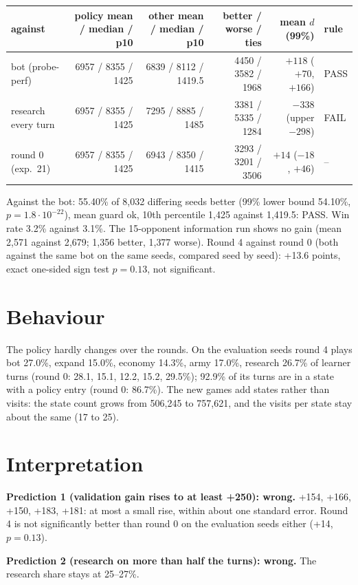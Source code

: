 \documentclass{../polyexp}
\begin{document}
\begin{center}\small
\begin{tabular}{lrrrrl}
\toprule
against & policy mean / median / p10 & other mean / median / p10 & better / worse / ties & mean $d$ (99\%) & rule \\
\midrule
bot (probe-perf) & 6957 / 8355 / 1425 & 6839 / 8112 / 1419.5 & 4450 / 3582 / 1968 & $+118$ ($+70$, $+166$) & PASS \\
research every turn & 6957 / 8355 / 1425 & 7295 / 8885 / 1485 & 3381 / 5335 / 1284 & $-338$ (upper $-298$) & FAIL \\
round 0 (exp.\ 21) & 6957 / 8355 / 1425 & 6943 / 8350 / 1415 & 3293 / 3201 / 3506 & $+14$ ($-18$, $+46$) & -- \\
\bottomrule
\end{tabular}
\end{center}
Against the bot: 55.40\% of 8{,}032 differing seeds better (99\% lower bound 54.10\%, $p = 1.8\cdot10^{-22}$), mean
guard ok, 10th percentile 1{,}425 against 1{,}419.5: PASS. Win rate 3.2\% against 3.1\%. The 15-opponent information
run shows no gain (mean 2{,}571 against 2{,}679; 1{,}356 better, 1{,}377 worse). Round 4 against round 0 (both
against the same bot on the same seeds, compared seed by seed): +13.6 points, exact one-sided sign test
$p = 0.13$, not significant.

\section{Behaviour}
The policy hardly changes over the rounds. On the evaluation seeds round 4 plays bot 27.0\%, expand 15.0\%,
economy 14.3\%, army 17.0\%, research 26.7\% of learner turns (round 0: 28.1, 15.1, 12.2, 15.2, 29.5\%); 92.9\% of its
turns are in a state with a policy entry (round 0: 86.7\%). The new games add states rather than visits: the state
count grows from 506{,}245 to 757{,}621, and the visits per state stay about the same (17 to 25).

\section{Interpretation}
\textbf{Prediction 1 (validation gain rises to at least +250): wrong.} +154, +166, +150, +183, +181: at most a
small rise, within about one standard error. Round 4 is not significantly better than round 0 on the evaluation
seeds either (+14, $p = 0.13$).

\textbf{Prediction 2 (research on more than half the turns): wrong.} The research share stays at 25--27\%.
\end{document}
